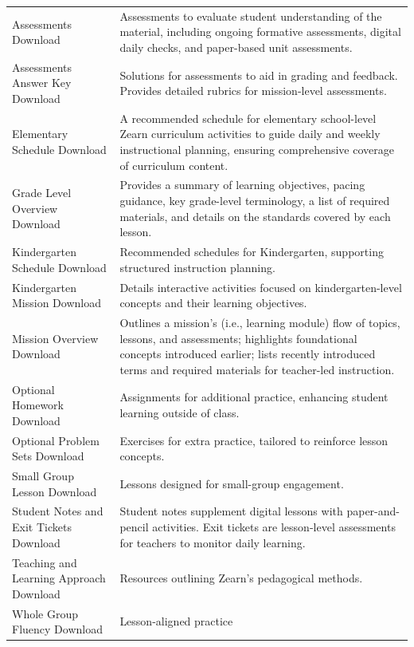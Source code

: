 \documentclass[
  number,
  preprint,
  3p,
  onecolumn]{elsarticle}
\begin{document}
\begin{longtable}[]{@{}
  >{\raggedright\arraybackslash}p{}
  >{\raggedright\arraybackslash}p{}@{}}
Assessments Download \citep{zearnb} & Assessments to evaluate student
understanding of the material, including ongoing formative assessments,
digital daily checks, and paper-based unit assessments. \\
Assessments Answer Key Download \citep{zearnc} & Solutions for
assessments to aid in grading and feedback. Provides detailed rubrics
for mission-level assessments. \\
Elementary Schedule Download \citep{zearne} & A recommended schedule for
elementary school-level Zearn curriculum activities to guide daily and
weekly instructional planning, ensuring comprehensive coverage of
curriculum content. \\
Grade Level Overview Download \citep{zearnf} & Provides a summary of
learning objectives, pacing guidance, key grade-level terminology, a
list of required materials, and details on the standards covered by each
lesson. \\
Kindergarten Schedule Download \citep{zearng} & Recommended schedules
for Kindergarten, supporting structured instruction planning. \\
Kindergarten Mission Download \citep{zearnh} & Details interactive
activities focused on kindergarten-level concepts and their learning
objectives. \\
Mission Overview Download \citep{zearnf} & Outlines a mission's (i.e.,
learning module) flow of topics, lessons, and assessments; highlights
foundational concepts introduced earlier; lists recently introduced
terms and required materials for teacher-led instruction. \\
Optional Homework Download \citep{zearnj} & Assignments for additional
practice, enhancing student learning outside of class. \\
Optional Problem Sets Download \citep{zearnk} & Exercises for extra
practice, tailored to reinforce lesson concepts. \\
Small Group Lesson Download \citep{zearnl} & Lessons designed for
small-group engagement. \\
Student Notes and Exit Tickets Download \citep{zearnz, zearny} & Student
notes supplement digital lessons with paper-and-pencil activities. Exit
tickets are lesson-level assessments for teachers to monitor daily
learning. \\
Teaching and Learning Approach Download \citep{zearnn} & Resources
outlining Zearn's pedagogical methods. \\
Whole Group Fluency Download \citep{zearno} & Lesson-aligned practice

\end{longtable}
\end{document}
